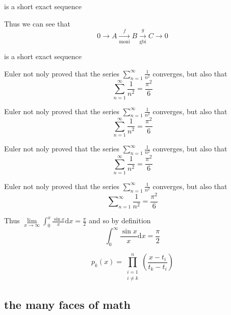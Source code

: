\documentclass[a4paper, UTF8]{article}
\begin{document}
is a short exact sequence

Thus we can see that
\begin{equation*}
    0\xrightarrow{} A\xrightarrow[\text{moni}]{f} B\xrightarrow[\text{gbi}]{g} C\xrightarrow{} 0
\end{equation*}

is a short exact sequence

Euler not noly proved that the series $\sum_{n=1}^{\infty}\frac{1}{n^2}$ converges, but also that
\begin{equation*}
    \sum_{n=1}^{\infty}\frac{1}{n^2}=\frac{\pi^{2}}{6}
\end{equation*}

Euler not noly proved that the series $\displaystyle\sum_{n=1}^{\infty}\frac{1}{n^2}$ converges, but also that
\begin{equation*}
    \sum_{n=1}^{\infty}\frac{1}{n^2}=\frac{\pi^{2}}{6}
\end{equation*}

Euler not noly proved that the series $\sum\limits_{n=1}^{\infty} \frac{1}{n^2}$ converges, but also that
\begin{equation*}
    \sum_{n=1}^{\infty}\frac{1}{n^2}=\frac{\pi^{2}}{6}
\end{equation*}

Euler not noly proved that the series $\sum\limits_{n=1}^{\infty} \frac{1}{n^2}$ converges, but also that
\begin{equation*}
    \sum\nolimits_{n=1}^{\infty}\frac{1}{n^2}=\frac{\pi^{2}}{6}
\end{equation*}

Thus
$\lim\limits_{x\to\infty}\int_{0}^{x}\frac{\sin{x}}{x}\mathrm{d}x=\frac{\pi}{2}$
and so by definition
\begin{equation*}
    \int_{0}^{\infty}\frac{\sin{x}}{x}\mathrm{d}x=\frac{\pi}{2}
\end{equation*}

\begin{equation*}
    p_{k}(x)=\prod_{\substack{i=1\\i\ne k}}^n \left(\frac{x-t_i}{t_k-t_i} \right)
\end{equation*}

\subsection{the many faces of math}
\end{document}
